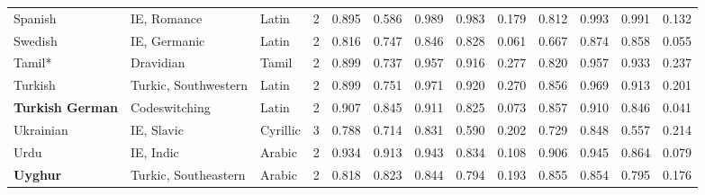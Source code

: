 \begin{tabular}{lllrrrrrrrrrr}
                        Spanish &                     IE, Romance &      Latin &         2 &                       0.895 &                         0.586 &         0.989 &                  0.983 &            0.179 &                         0.812 &         0.993 &                  0.991 &            0.132 \\
                        Swedish &                    IE, Germanic &      Latin &         2 &                       0.816 &                         0.747 &         0.846 &                  0.828 &            0.061 &                         0.667 &         0.874 &                  0.858 &            0.055 \\
                         Tamil* &                       Dravidian &      Tamil &         2 &                       0.899 &                         0.737 &         0.957 &                  0.916 &            0.277 &                         0.820 &         0.957 &                  0.933 &            0.237 \\
                        Turkish &            Turkic, Southwestern &      Latin &         2 &                       0.899 &                         0.751 &         0.971 &                  0.920 &            0.270 &                         0.856 &         0.969 &                  0.913 &            0.201 \\
        \textbf{Turkish German} &                   Codeswitching &      Latin &         2 &                       0.907 &                         0.845 &         0.911 &                  0.825 &            0.073 &                         0.857 &         0.910 &                  0.846 &            0.041 \\
                      Ukrainian &                      IE, Slavic &   Cyrillic &         3 &                       0.788 &                         0.714 &         0.831 &                  0.590 &            0.202 &                         0.729 &         0.848 &                  0.557 &            0.214 \\
                           Urdu &                       IE, Indic &     Arabic &         2 &                       0.934 &                         0.913 &         0.943 &                  0.834 &            0.108 &                         0.906 &         0.945 &                  0.864 &            0.079 \\
                \textbf{Uyghur} &            Turkic, Southeastern &     Arabic &         2 &                       0.818 &                         0.823 &         0.844 &                  0.794 &            0.193 &                         0.855 &         0.854 &                  0.795 &            0.176 \\

\end{tabular}
